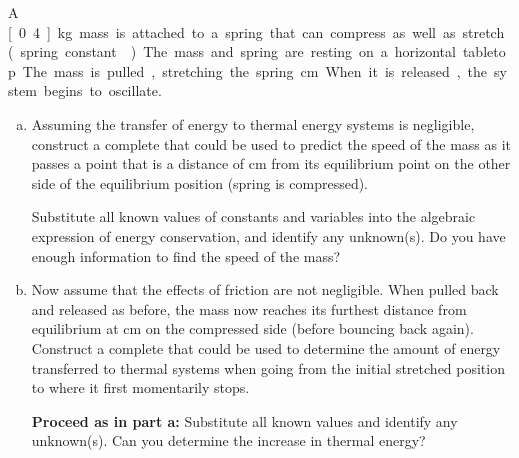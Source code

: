 \label{fnt2.2.1-7}

A \unit[0.4]{kg} mass is attached to a spring that can compress as well as stretch (spring constant ). The mass and spring are resting on a horizontal tabletop. The mass is pulled, stretching the spring \unit[48]{cm}. When it is released, the system begins to oscillate.

\begin{enumerate}[(a)]
	\item\label{fnt2.2.1-7a} Assuming the transfer of energy to thermal energy systems is negligible, construct a complete \EnergyDiagram{} that could be used to predict the speed of the mass as it passes a point that is a distance of \unit[39]{cm} from its equilibrium point on the other side of the equilibrium position (spring is compressed).
	
		Substitute all known values of constants and variables into the algebraic expression of energy conservation, and identify any unknown(s). Do you have enough information to find the speed of the mass?
	
	\item\label{fnt2.2.1-7b} Now assume that the effects of friction are not negligible. When pulled back and released as before, the mass now reaches its furthest distance from equilibrium at \unit[40]{cm} on the compressed side (before bouncing back again). Construct a complete \EnergyDiagram{} that could be used to determine the amount of energy transferred to thermal systems when going from the initial stretched position to where it first momentarily stops.
	
		\textbf{Proceed as in part a:} Substitute all known values and identify any unknown(s). Can you determine the increase in thermal energy?
\end{enumerate}